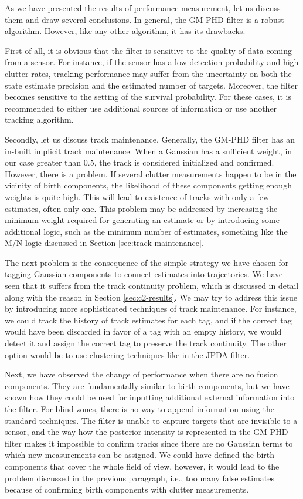 As we have presented the results of performance measurement, let us discuss them and draw several conclusions. In general, the GM-PHD filter is a robust algorithm. However, like any other algorithm, it has its drawbacks.

First of all, it is obvious that the filter is sensitive to the quality of data coming from a sensor. For instance, if the sensor has a low detection probability and high clutter rates, tracking performance may suffer from the uncertainty on both the state estimate precision and the estimated number of targets. Moreover, the filter becomes sensitive to the setting of the survival probability. For these cases, it is recommended to either use additional sources of information or use another tracking algorithm.

Secondly, let us discuss track maintenance. Generally, the GM-PHD filter has an in-built implicit track maintenance. When a Gaussian has a sufficient weight, in our case greater than $0.5$, the track is considered initialized and confirmed. However, there is a problem. If several clutter measurements happen to be in the vicinity of birth components, the likelihood of these components getting enough weights is quite high. This will lead to existence of tracks with only a few estimates, often only one. This problem may be addressed by increasing the minimum weight required for generating an estimate or by introducing some additional logic, such as the minimum number of estimates, something like the M/N logic discussed in Section \ref{sec:track-maintenance}.

The next problem is the consequence of the simple strategy we have chosen for tagging Gaussian components to connect estimates into trajectories. We have seen that it suffers from the track continuity problem, which is discussed in detail along with the reason in Section \ref{sec:c2-results}. We may try to address this issue by introducing more sophisticated techniques of track maintenance. For instance, we could track the history of track estimates for each tag, and if the correct tag would have been discarded in favor of a tag with an empty history, we would detect it and assign the correct tag to preserve the track continuity. The other option would be to use clustering techniques like in the JPDA filter.

Next, we have observed the change of performance when there are no fusion components. They are fundamentally similar to birth components, but we have shown how they could be used for inputting additional external information into the filter. For blind zones, there is no way to append information using the standard techniques. The filter is unable to capture targets that are invisible to a sensor, and the way how the posterior intensity is represented in the GM-PHD filter makes it impossible to confirm tracks since there are no Gaussian terms to which new measurements can be assigned. We could have defined the birth components that cover the whole field of view, however, it would lead to the problem discussed in the previous paragraph, i.e., too many false estimates because of confirming birth components with clutter measurements.

